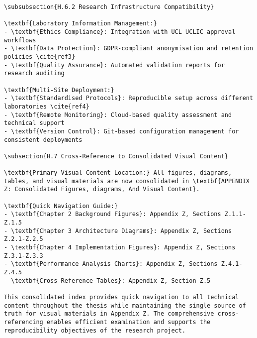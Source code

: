 \begin{verbatim}
\subsubsection{H.6.2 Research Infrastructure Compatibility}

\textbf{Laboratory Information Management:}
- \textbf{Ethics Compliance}: Integration with UCL UCLIC approval workflows
- \textbf{Data Protection}: GDPR-compliant anonymisation and retention policies \cite{ref3}
- \textbf{Quality Assurance}: Automated validation reports for research auditing

\textbf{Multi-Site Deployment:}
- \textbf{Standardised Protocols}: Reproducible setup across different laboratories \cite{ref4}
- \textbf{Remote Monitoring}: Cloud-based quality assessment and technical support
- \textbf{Version Control}: Git-based configuration management for consistent deployments

\subsection{H.7 Cross-Reference to Consolidated Visual Content}

\textbf{Primary Visual Content Location:} All figures, diagrams, tables, and visual materials are now consolidated in \textbf{APPENDIX Z: Consolidated Figures, diagrams, And Visual Content}.

\textbf{Quick Navigation Guide:}
- \textbf{Chapter 2 Background Figures}: Appendix Z, Sections Z.1.1-Z.1.5
- \textbf{Chapter 3 Architecture Diagrams}: Appendix Z, Sections Z.2.1-Z.2.5
- \textbf{Chapter 4 Implementation Figures}: Appendix Z, Sections Z.3.1-Z.3.3
- \textbf{Performance Analysis Charts}: Appendix Z, Sections Z.4.1-Z.4.5
- \textbf{Cross-Reference Tables}: Appendix Z, Section Z.5

This consolidated index provides quick navigation to all technical content throughout the thesis while maintaining the single source of truth for visual materials in Appendix Z. The comprehensive cross-referencing enables efficient examination and supports the reproducibility objectives of the research project.
\end{verbatim}
